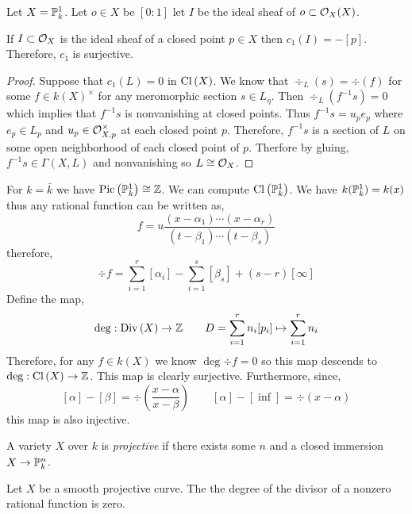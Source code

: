 \documentclass[12pt]{article}
\begin{document}
\begin{example}
Let $X = \P^1_k$. Let $o \in X$ be $[0 : 1]$ let $I$ be the ideal sheaf of $o \subset \struct{X}(X)$. 
\end{example}

\begin{lemma}
If $I \subset \struct{X}$ is the ideal sheaf of a closed point $p \in X$ then $c_1(I) = - [p]$. Therefore, $c_1$ is surjective. 
\end{lemma}

\begin{lemma}

\end{lemma}

\begin{proof}
Suppose that $c_1(L) = 0$ in $\Cl{X}$. We know that $\div_L(s) = \div(f)$ for some $f \in k(X)^\times$ for any meromorphic section $s \in L_\eta$. Then $\div_L(f^{-1} s) = 0$ which implies that $f^{-1} s$ is nonvanishing at closed points. Thus $f^{-1} s = u_p e_p$ where $e_p \in L_p$ and $u_p \in \stalk{X}{p}^\times$ at each closed point $p$. Therefore, $f^{-1} s$ is a section of $L$ on some open neighborhood of each closed point of $p$. Therfore by gluing, $f^{-1} s \in \Gamma(X, L)$ and nonvanishing so $L \cong \struct{X}$. 
\end{proof}

\begin{example}
For $k = \bar{k}$ we have $\Pic{\P^1_k} \cong \Z$. We can compute $\Cl{\P_k^1}$. We have $k(\P^1_k) = k(x)$ thus any rational function can be written as,
\[ f = u \frac{(x - \alpha_1) \cdots (x - \alpha_r)}{(t - \beta_1) \cdots (t - \beta_s)} \]
therefore,
\[ \div{f} = \sum_{i = 1}^r [\alpha_i] - \sum_{i = 1}^s [\beta_s] + (s - r) [\infty] \]
Define the map,
\[ \deg : \Div{X} \to \Z \quad \quad D = \sum_{i = 1}^r n_i [p_i] \mapsto \sum_{i = 1}^r n_i \]
Therefore, for any $f \in k(X)$ we know $\deg{\div{f}} = 0$ so this map descends to $\deg : \Cl{X} \to \Z$. This map is clearly surjective. Furthermore, since,
\[ [\alpha] - [\beta] = \div{\left( \frac{x - \alpha}{x - \beta} \right)} \quad \quad [\alpha] - [\inf] = \div{(x - \alpha)} \]
this map is also injective. 
\end{example}

\begin{definition}
A variety $X$ over $k$ is \textit{projective} if there exists some $n$ and a closed immersion $X \to \P^n_k$.
\end{definition}

\begin{proposition}
Let $X$ be a smooth projective curve. The the degree of the divisor of a nonzero rational function is zero. 
\end{proposition}
\end{document}
